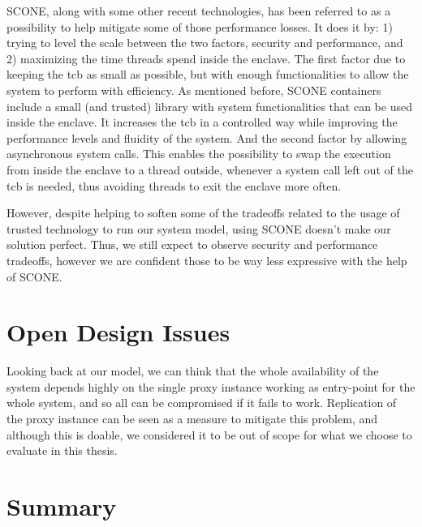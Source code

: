 SCONE, along with some other recent technologies, has been referred to as a possibility to help mitigate some of those performance losses. 
It does it by: 
1) trying to level the scale between the two factors, security and performance, and
2) maximizing the time threads spend inside the enclave.
The first factor due to keeping the \gls{tcb} as small as possible, but with enough functionalities to allow the system to perform with efficiency. As mentioned before, SCONE containers include a small (and trusted) library with system functionalities that can be used inside the enclave. It increases the \gls{tcb} in a controlled way while improving the performance levels and fluidity of the system.
And the second factor by allowing asynchronous system calls. This enables the possibility to swap the execution from inside the enclave to a thread outside, whenever a system call left out of the \gls{tcb} is needed, thus avoiding threads to exit the enclave more often.

However, despite helping to soften some of the tradeoffs related to the usage of trusted technology to run our system model, using SCONE doesn't make our solution perfect. Thus, we still expect to observe security and performance tradeoffs, however we are confident those to be way less expressive with the help of SCONE.

\section{Open Design Issues} %
\label{sec:design_openIssues}

Looking back at our model, we can think that the whole availability of the system depends highly on the single proxy instance working as entry-point for the whole system, and so all can be compromised if it fails to work. 
Replication of the proxy instance can be seen as a measure to mitigate this problem, and although this is doable, we considered it to be out of scope for what we choose to evaluate in this thesis. 



\section{Summary} %
\label{sec:sysModel_summary}

